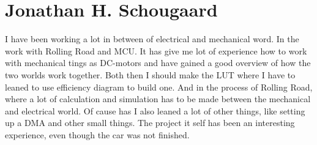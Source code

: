 \section{Jonathan H. Schougaard}

I have been working a lot in between of electrical and mechanical word. In the work with Rolling Road and MCU. It has give me lot of experience how to work with mechanical tings as DC-motors and have gained a good overview of how the two worlds work together. Both then I should make the LUT where I have to leaned to use efficiency diagram to build one. And in the process of Rolling Road, where a lot of calculation and simulation has to be made between the mechanical and electrical world. 
Of cause has I also leaned a lot of other things, like setting up a DMA and other small things. The project it self has been an interesting experience, even though the car was not finished.
